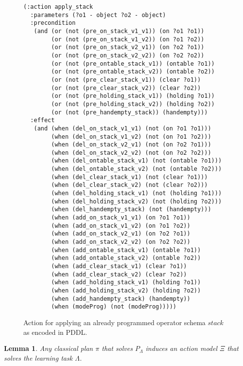 \documentclass[letterpaper]{article} %
\newtheorem{lemma}[theorem]{Lemma}
\begin{document}
\begin{figure}
\begin{scriptsize}
\begin{verbatim}
(:action apply_stack
  :parameters (?o1 - object ?o2 - object)
  :precondition
   (and (or (not (pre_on_stack_v1_v1)) (on ?o1 ?o1))
        (or (not (pre_on_stack_v1_v2)) (on ?o1 ?o2))
        (or (not (pre_on_stack_v2_v1)) (on ?o2 ?o1))
        (or (not (pre_on_stack_v2_v2)) (on ?o2 ?o2))
        (or (not (pre_ontable_stack_v1)) (ontable ?o1))
        (or (not (pre_ontable_stack_v2)) (ontable ?o2))
        (or (not (pre_clear_stack_v1)) (clear ?o1))
        (or (not (pre_clear_stack_v2)) (clear ?o2))
        (or (not (pre_holding_stack_v1)) (holding ?o1))
        (or (not (pre_holding_stack_v2)) (holding ?o2))
        (or (not (pre_handempty_stack)) (handempty)))
  :effect
   (and (when (del_on_stack_v1_v1) (not (on ?o1 ?o1)))
        (when (del_on_stack_v1_v2) (not (on ?o1 ?o2)))
        (when (del_on_stack_v2_v1) (not (on ?o2 ?o1)))
        (when (del_on_stack_v2_v2) (not (on ?o2 ?o2)))
        (when (del_ontable_stack_v1) (not (ontable ?o1)))
        (when (del_ontable_stack_v2) (not (ontable ?o2)))
        (when (del_clear_stack_v1) (not (clear ?o1)))
        (when (del_clear_stack_v2) (not (clear ?o2)))
        (when (del_holding_stack_v1) (not (holding ?o1)))
        (when (del_holding_stack_v2) (not (holding ?o2)))
        (when (del_handempty_stack) (not (handempty)))
        (when (add_on_stack_v1_v1) (on ?o1 ?o1))
        (when (add_on_stack_v1_v2) (on ?o1 ?o2))
        (when (add_on_stack_v2_v1) (on ?o2 ?o1))
        (when (add_on_stack_v2_v2) (on ?o2 ?o2))
        (when (add_ontable_stack_v1) (ontable ?o1))
        (when (add_ontable_stack_v2) (ontable ?o2))
        (when (add_clear_stack_v1) (clear ?o1))
        (when (add_clear_stack_v2) (clear ?o2))
        (when (add_holding_stack_v1) (holding ?o1))
        (when (add_holding_stack_v2) (holding ?o2))
        (when (add_handempty_stack) (handempty))
        (when (modeProg) (not (modeProg)))))
\end{verbatim}
\end{scriptsize}
 \caption{\small Action for applying an already programmed operator schema $stack$ as encoded in PDDL.}
\label{fig:compilation}
\end{figure}


\begin{lemma}
Any classical plan $\pi$ that solves $P_{\Lambda}$ induces an action model $\Xi$ that solves the learning task $\Lambda$.
\end{lemma}
\end{document}

